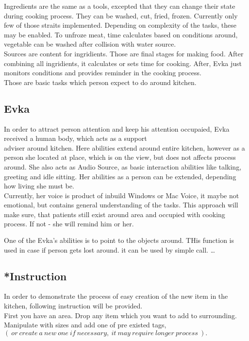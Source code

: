 \documentclass[18pt]{article}
\numberwithin{equation}{section} %
\numberwithin{figure}{section} %
\numberwithin{table}{section} %
\begin{document}
	Ingredients are the same as a tools, excepted that they can change their state during cooking process. They can be washed, cut, fried, frozen. Currently only few of those straits implemented. Depending on complexity of the tasks, these may be enabled. To unfroze meat, time calculates based on conditions around, vegetable can be washed after collision with water source. \\
	
	Sources are content for ingridients. Those are final stages for making food. After combining all ingridients, it calculates or sets time for cooking. After, Evka just monitors conditions and provides reminder in the cooking process. \\
	
	Those are basic tasks which person expect to do around kitchen. 
	
	\subsection{Evka}
	In order to attract person attention and keep his attention occupaied, Evka received a human body, which acts as a support\\adviser around kitchen. Here abilities extend around entire kitchen, however as a person she located at place, which is on the view, but does not affects process around. She also acts as Audio Source, as basic interaction abilities like talking, greeting and idle sitting. Her abilities as a person can be extended, depending how living she must be. \\
	
	Currently, her voice is product of inbuild Windows or Mac Voice, it maybe not emotional, but contains general understanding of the tasks. This approach will make sure, that patients still exist around area and occupied with cooking process. If not - she will remind him or her.
	
	
	One of the Evka's abilities is to point to the objects around. THis function is used in case if person gets lost around. it can be used by simple call. \ldots
	\subsection{*Instruction}
	
	In order to demonstrate the process of easy creation of the new item in the kitchen, following instruction will be provided.\\
	
	First you have an area. Drop any item which you want to add to surrounding. Manipulate with sizes and add one of pre existed tags, $\left(\ or\ create\ a\ new\ one\ if\ necessary,\ it\ may\ require\ longer\ process\  \right) . $ \\
	
\end{document}
